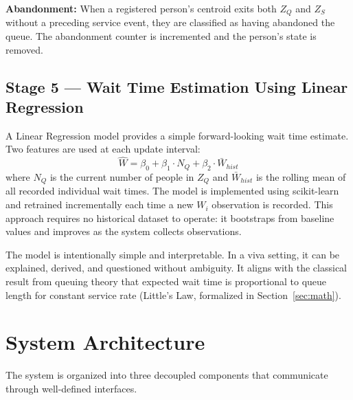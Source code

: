 \documentclass[journal, twocolumn]{IEEEtran}
\begin{document}
\textbf{Abandonment:} When a registered person's centroid exits both $Z_Q$ and $Z_S$ without a preceding service event, they are classified as having abandoned the queue. The abandonment counter is incremented and the person's state is removed.

\subsection{Stage 5 — Wait Time Estimation Using Linear Regression}
A Linear Regression model provides a simple forward-looking wait time estimate. Two features are used at each update interval:
\begin{equation}
\hat{W} = \beta_0 + \beta_1 \cdot N_Q + \beta_2 \cdot \bar{W}_{hist}
\end{equation}
where $N_Q$ is the current number of people in $Z_Q$ and $\bar{W}_{hist}$ is the rolling mean of all recorded individual wait times. The model is implemented using scikit-learn and retrained incrementally each time a new $W_i$ observation is recorded. This approach requires no historical dataset to operate: it bootstraps from baseline values and improves as the system collects observations.

The model is intentionally simple and interpretable. In a viva setting, it can be explained, derived, and questioned without ambiguity. It aligns with the classical result from queuing theory that expected wait time is proportional to queue length for constant service rate (Little's Law, formalized in Section~\ref{sec:math}).

\section{System Architecture}
\label{sec:architecture}

The system is organized into three decoupled components that communicate through well-defined interfaces.
\end{document}
